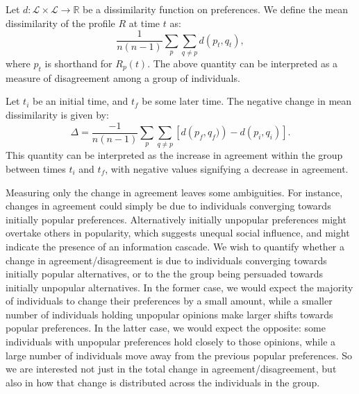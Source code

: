 Let $d:\mathcal{L}\times\mathcal{L} \to \mathbb{R}$ be a
dissimilarity function on preferences.
We define the mean dissimilarity of the profile $R$ at time $t$ as:
\begin{equation}
    \frac{1}{n(n-1)} \sum_p \sum_{q \neq p} d\left(p_t, q_t\right),
\end{equation}
where $p_t$ is shorthand for $R_p(t)$.
The above quantity can be interpreted as a measure of disagreement among a group of individuals.

Let $t_i$ be an initial time, and $t_f$ be some later time.
The negative change in mean dissimilarity is given by:
\begin{equation}
    \label{eqn:Delta}
    \Delta =
    \frac{-1}{n(n-1)} \sum_p \sum_{q \neq p}
    \left[
    d\left(p_f, q_f)\right)
    - d\left(p_i, q_i\right)
    \right].
\end{equation}
This quantity can be interpreted as the increase in agreement within the group between times $t_i$ and $t_f$,
with negative values signifying a decrease in agreement.

Measuring only the change in agreement leaves some ambiguities.
For instance, changes in agreement could simply be due to individuals converging towards initially popular preferences.
Alternatively initially unpopular preferences might overtake others in popularity,
which suggests unequal social influence, and might indicate the presence of an information cascade.
We wish to quantify whether a change in agreement/disagreement is due to individuals converging towards initially popular alternatives, or to the the group being persuaded towards initially unpopular alternatives.
In the former case, we would expect the majority of individuals to change their preferences by a small amount, while a smaller number of individuals holding unpopular opinions make larger shifts towards popular preferences.
In the latter case, we would expect the opposite:
some individuals with unpopular preferences hold closely to those opinions, while a large number of individuals move away from the previous popular preferences.
So we are interested not just in the total change in agreement/disagreement,
but also in how that change is distributed across the individuals in the group.

